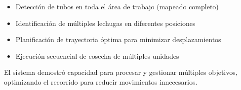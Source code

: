 \begin{itemize}
    \item Detección de tubos en toda el área de trabajo (mapeado completo)
    \item Identificación de múltiples lechugas en diferentes posiciones
    \item Planificación de trayectoria óptima para minimizar desplazamientos
    \item Ejecución secuencial de cosecha de múltiples unidades
\end{itemize}

El sistema demostró capacidad para procesar y gestionar múltiples objetivos, optimizando el recorrido para reducir movimientos innecesarios.


